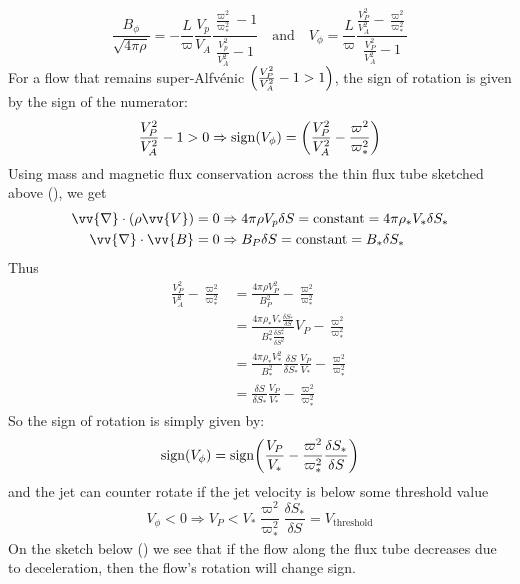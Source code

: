 \documentclass[10pt,a4paper,english]{article}
\let\originalleft\left
\let\originalright\right
\renewcommand{\left}{\mathopen{}\mathclose\bgroup\originalleft}
\renewcommand{\right}{\aftergroup\egroup\originalright}
\begin{document}
\begin{equation}
  \frac{B_\phi}{\sqrt{4\pi\rho}} = - \frac{L}{\varpi}\frac{V_p}{V_A}\frac{\frac{\varpi^2}{\varpi_*^2}-1}{\frac{V_p^2}{V_A^2} - 1} \quad \mathrm{and} \quad
  V_\phi = \frac{L}{\varpi}\frac{\frac{V_P^2}{V_A^2} - \frac{\varpi^2}{\varpi_*^2}}{\frac{V_P^2}{V_A^2}-1}
\end{equation}
For a flow that remains super-Alfvénic $\left(\frac{V_P^2}{V_A^2}-1 > 1\right)$, the sign of rotation is given by the sign of the numerator:
\begin{equation}
  \frac{V_P^2}{V_A^2}- 1 > 0 \Rightarrow \mathrm{sign}\left( V_\phi \right) = \left( \frac{V_P^2}{V_A^2} - \frac{\varpi^2}{\varpi_*^2} \right)
\end{equation}
Using mass and magnetic flux conservation across the thin flux tube sketched above (), we get
\begin{align}
  \vv{\nabla}\cdot \left( \rho\vv{V} \right) = 0 &\Rightarrow 4\pi\rho V_p\delta S = \mathrm{constant} = 4\pi\rho_*V_*\delta S_* \\
  \vv{\nabla}\cdot\vv{B} = 0 & \Rightarrow B_P \delta S = \mathrm{constant} = B_*\delta S_*
\end{align}
Thus
\begin{align}
  \frac{V_P^2}{V_A^2} - \frac{\varpi^2}{\varpi_*^2}
  & = \frac{4\pi\rho V_P^2}{B_P^2} - \frac{\varpi^2}{\varpi_*^2} \\
  & = \frac{4\pi\rho_*V_* \frac{\delta S_*}{\delta S}}{B_*^2 \frac{\delta S_*^2}{\delta S^2}}V_P - \frac{\varpi^2}{\varpi_*^2} \\
  & = \frac{4\pi\rho_*V_*^2}{B_*^2}\frac{\delta S}{\delta S_*} \frac{V_P}{V_*} - \frac{\varpi^2}{\varpi_*^2} \\
  & = \frac{\delta S}{\delta S_*} \frac{V_P}{V_*} - \frac{\varpi^2}{\varpi_*^2}
\end{align}
So the sign of rotation is simply given by:
\begin{equation}
  \mathrm{sign}\left( V_\phi \right) = \mathrm{sign}\left( \frac{V_P}{V_*} - \frac{\varpi^2}{\varpi_*^2} \frac{\delta S_*}{\delta S} \right) 
\end{equation}
and the jet can counter rotate if the jet velocity is below some threshold value
\begin{equation}
  V_\phi < 0 \Rightarrow V_P < V_* \frac{\varpi^2}{\varpi_*^2} \frac{\delta S_*}{\delta S} = V_\mathrm{threshold}
\end{equation}
On the sketch below () we see that if the flow along the flux tube decreases due to deceleration, then the flow's rotation will change sign.
\end{document}

